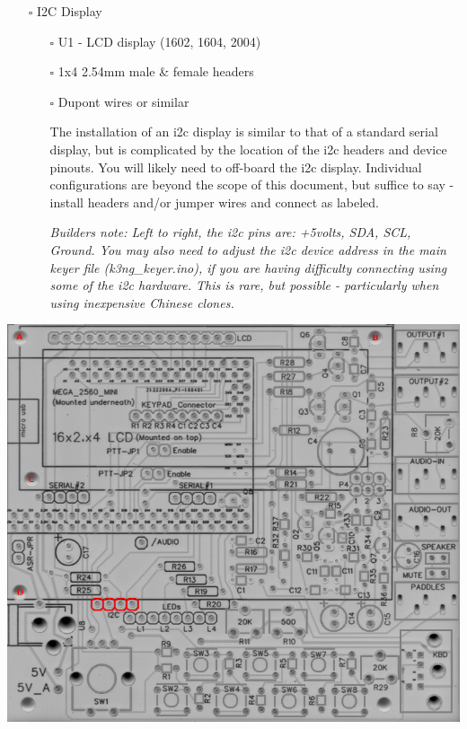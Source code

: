 \documentclass[11pt]{article}
\begin{document}
\newpage
\begin{itemize}
\item[{$\square$}] I2C Display
\begin{itemize}
\item[{$\square$}] U1 - LCD display (1602, 1604, 2004)
\item[{$\square$}] 1x4 2.54mm male \& female headers
\item[{$\square$}] Dupont wires or similar

The installation of an i2c display is similar to that of a standard serial display, but is complicated by the location of the i2c headers and device pinouts.  You will likely need to off-board the i2c display.  Individual configurations are beyond the scope of this document, but suffice to say - install headers and/or jumper wires and connect as labeled.

\emph{Builders note:  Left to right, the i2c pins are:  +5volts, SDA, SCL, Ground.  You may also need to adjust the i2c device address in the main keyer file (k3ng\_keyer.ino), if you are having difficulty connecting using some of the i2c hardware.  This is rare, but possible - particularly when using inexpensive Chinese clones.}
\end{itemize}
\end{itemize}
\begin{center}
\includegraphics[width=.9\linewidth]{../png/3.4/pcb-top-i2c-display.png}
\end{center}
\end{document}
